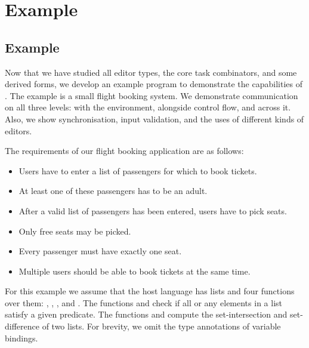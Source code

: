 
\section{Example}



\subsection{Example}

Now that we have studied all editor types, the core task combinators, and some derived forms,
we develop an example program to demonstrate the capabilities of \TOPHAT.
The example is a small flight booking system.
We demonstrate communication on all three levels: with the environment, alongside control flow, and across it.
Also, we show synchronisation, input validation, and the uses of different kinds of editors.


The requirements of our flight booking application are as follows:
\begin{itemize}
  \item Users have to enter a list of passengers for which to book tickets.
  \item At least one of these passengers has to be an adult.
  \item After a valid list of passengers has been entered, users have to pick seats.
  \item Only free seats may be picked.
  \item Every passenger must have exactly one seat.
  \item Multiple users should be able to book tickets at the same time.
\end{itemize}

For this example we assume that the host language has lists and four functions over them:
, , , and .
The functions  and  check if all or any elements in a list satisfy a given predicate.
The functions  and  compute the set-intersection and set-difference of two lists.
For brevity, we omit the type annotations of variable bindings.

